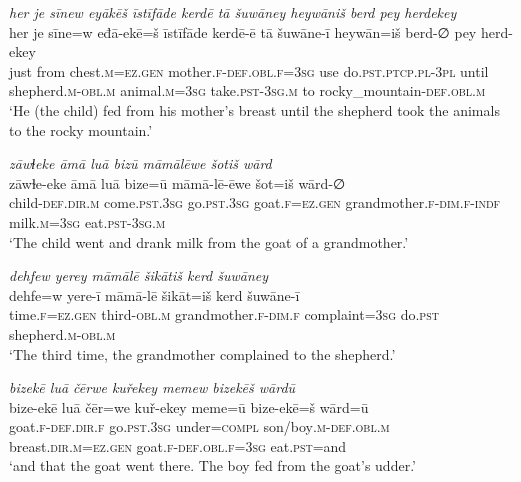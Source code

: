 \ea \label{KŠ.24}
\textit{her je sīnew eyākēš īstīfāde kerdē tā šuwāney heywāniš berd pey herdekey} \\ 
\gll her je sīne=w eđā-ekē=š īstīfāde kerdē-ē tā šuwāne-ī heywān=iš berd-∅ pey herd-ekey \\ 
 just from chest\textsc{.m}\textsc{=ez.gen} mother\textsc{.f}\textsc{-def}\textsc{.obl}\textsc{.f}\textsc{=3sg} use do\textsc{.pst}\textsc{.ptcp}\textsc{.pl}\textsc{-3pl} until shepherd\textsc{.m}\textsc{-obl}\textsc{.m} animal\textsc{.m}\textsc{=3sg} take\textsc{.pst}\textsc{-3sg}\textsc{.m} to rocky\_mountain\textsc{-def}\textsc{.obl}\textsc{.m} \\ 
\glt `He (the child) fed from his mother’s breast until the shepherd took the animals to the rocky mountain.'
\z 
 
\ea \label{KŠ.25}
\textit{zāwɫeke āmā luā bizū māmālēwe šotiš wārd} \\ 
\gll zāwɫe-eke āmā luā bize=ū māmā-lē-ēwe šot=iš wārd-∅ \\ 
 child\textsc{-def}\textsc{.dir}\textsc{.m} come\textsc{.pst}\textsc{.3sg} go\textsc{.pst}\textsc{.3sg} goat\textsc{.f}\textsc{=ez.gen} grandmother\textsc{.f}\textsc{-dim}\textsc{.f}\textsc{-indf} milk\textsc{.m}\textsc{=3sg} eat\textsc{.pst}\textsc{-3sg}\textsc{.m} \\ 
\glt `The child went and drank milk from the goat of a grandmother.'
\z 
 
\ea \label{KŠ.27}
\textit{dehfew yerey māmālē šikātiš kerd šuwāney} \\ 
\gll dehfe=w yere-ī māmā-lē šikāt=iš kerd šuwāne-ī \\ 
 time\textsc{.f}\textsc{=ez.gen} third\textsc{-obl}\textsc{.m} grandmother\textsc{.f}\textsc{-dim}\textsc{.f} complaint\textsc{=3sg} do\textsc{.pst} shepherd\textsc{.m}\textsc{-obl}\textsc{.m} \\ 
\glt `The third time, the grandmother complained to the shepherd.'
\z 
 
\ea \label{KŠ.31}
\textit{bizekē luā čērwe kuřekey memew bizekēš wārdū} \\ 
\gll bize-ekē luā čēr=we kuř-ekey meme=ū bize-ekē=š wārd=ū \\ 
 goat\textsc{.f}\textsc{-def}\textsc{.dir}\textsc{.f} go\textsc{.pst}\textsc{.3sg} under\textsc{=compl} son/boy\textsc{.m}\textsc{-def}\textsc{.obl}\textsc{.m} breast\textsc{.dir}\textsc{.m}\textsc{=ez.gen} goat\textsc{.f}\textsc{-def}\textsc{.obl}\textsc{.f}\textsc{=3sg} eat\textsc{.pst}=and \\ 
\glt `and that the goat went there. The boy fed from the goat’s udder.'
\z 
 
